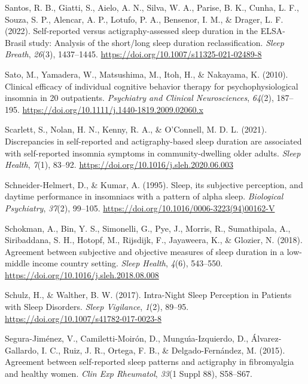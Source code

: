 \documentclass[
]{article}
\newlength{\cslhangindent}
\newenvironment{CSLReferences}[2] %
 {\begin{list}{}{%
  \setlength{\itemindent}{0pt}
  \setlength{\leftmargin}{0pt}
  \setlength{\parsep}{0pt}
  \ifodd #1
   \setlength{\leftmargin}{\cslhangindent}
   \setlength{\itemindent}{-1\cslhangindent}
  \fi
  \setlength{\itemsep}{#2\baselineskip}}}
 {\end{list}}
\begin{document}
\begin{CSLReferences}{1}{0}
Santos, R. B., Giatti, S., Aielo, A. N., Silva, W. A., Parise, B. K., Cunha, L. F., Souza, S. P., Alencar, A. P., Lotufo, P. A., Bensenor, I. M., \& Drager, L. F. (2022). Self-reported versus actigraphy-assessed sleep duration in the {ELSA}-{Brasil} study: Analysis of the short/long sleep duration reclassification. \emph{Sleep Breath}, \emph{26}(3), 1437--1445. \url{https://doi.org/10.1007/s11325-021-02489-8}

Sato, M., Yamadera, W., Matsushima, M., Itoh, H., \& Nakayama, K. (2010). Clinical efficacy of individual cognitive behavior therapy for psychophysiological insomnia in 20 outpatients. \emph{Psychiatry and Clinical Neurosciences}, \emph{64}(2), 187--195. \url{https://doi.org/10.1111/j.1440-1819.2009.02060.x}

Scarlett, S., Nolan, H. N., Kenny, R. A., \& O'Connell, M. D. L. (2021). Discrepancies in self-reported and actigraphy-based sleep duration are associated with self-reported insomnia symptoms in community-dwelling older adults. \emph{Sleep Health}, \emph{7}(1), 83--92. \url{https://doi.org/10.1016/j.sleh.2020.06.003}

Schneider-Helmert, D., \& Kumar, A. (1995). Sleep, its subjective perception, and daytime performance in insomniacs with a pattern of alpha sleep. \emph{Biological Psychiatry}, \emph{37}(2), 99--105. \url{https://doi.org/10.1016/0006-3223(94)00162-V}

Schokman, A., Bin, Y. S., Simonelli, G., Pye, J., Morris, R., Sumathipala, A., Siribaddana, S. H., Hotopf, M., Rijsdijk, F., Jayaweera, K., \& Glozier, N. (2018). Agreement between subjective and objective measures of sleep duration in a low-middle income country setting. \emph{Sleep Health}, \emph{4}(6), 543--550. \url{https://doi.org/10.1016/j.sleh.2018.08.008}

Schulz, H., \& Walther, B. W. (2017). Intra-{Night} {Sleep} {Perception} in {Patients} with {Sleep} {Disorders}. \emph{Sleep Vigilance}, \emph{1}(2), 89--95. \url{https://doi.org/10.1007/s41782-017-0023-8}

Segura-Jiménez, V., Camiletti-Moirón, D., Munguı́a-Izquierdo, D., Álvarez-Gallardo, I. C., Ruiz, J. R., Ortega, F. B., \& Delgado-Fernández, M. (2015). Agreement between self-reported sleep patterns and actigraphy in fibromyalgia and healthy women. \emph{Clin Exp Rheumatol}, \emph{33}(1 Suppl 88), S58--S67.


\end{CSLReferences}
\end{document}
